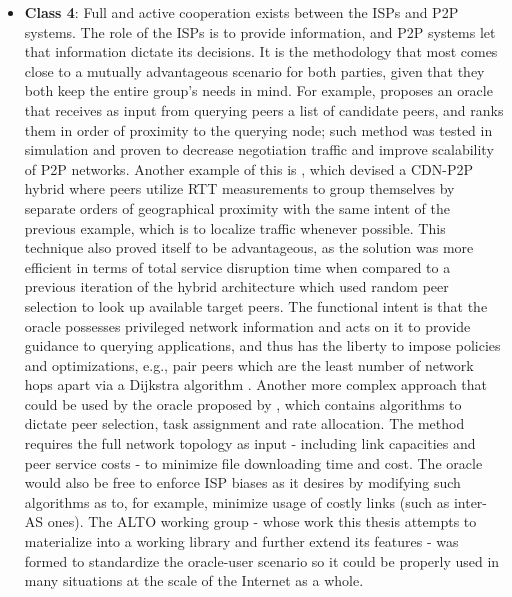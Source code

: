 \documentclass[
  oneside,
  11pt, a4paper,
  footinclude=true,
  headinclude=true,
  cleardoublepage=empty
]{scrbook}
\begin{document}
\begin{itemize}
	    \item \textbf{Class 4}: Full and active cooperation exists between the ISPs and P2P systems. The role of the ISPs is to provide information, and P2P systems let that information dictate its decisions. It is the methodology that most comes close to a mutually advantageous scenario for both parties, given that they both keep the entire group's needs in mind. For example, \cite{locality-aware-p2p} proposes an oracle that receives as input from querying peers a list of candidate peers, and ranks them in order of proximity to the querying node; such method was tested in simulation and proven to decrease negotiation traffic and improve scalability of P2P networks. Another example of this is \cite{kim2011}, which devised a CDN-P2P hybrid where peers utilize RTT measurements to group themselves by separate orders of geographical proximity with the same intent of the previous example, which is to localize traffic whenever possible. This technique also proved itself to be advantageous, as the solution was more efficient in terms of total service disruption time when compared to a previous iteration of the hybrid architecture which used random peer selection to look up available target peers. The functional intent is that the oracle possesses privileged network information and acts on it to provide guidance to querying applications, and thus has the liberty to impose policies and optimizations, e.g., pair peers which are the least number of network hops apart via a Dijkstra algorithm . Another more complex approach that could be used by the oracle proposed by \cite{han2009}, which contains algorithms to dictate peer selection, task assignment and rate allocation. The method requires the full network topology as input - including link capacities and peer service costs - to minimize file downloading time and cost. The oracle would also be free to enforce ISP biases as it desires by modifying such algorithms as to, for example, minimize usage of costly links (such as inter-AS ones). The ALTO working group - whose work this thesis attempts to materialize into a working library and further extend its features - was formed to standardize the oracle-user scenario so it could be properly used in many situations at the scale of the Internet as a whole. 
	\end{itemize}
		
\end{document}
